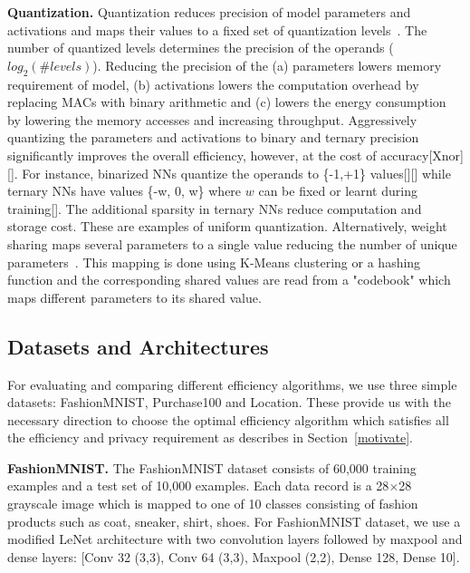 \noindent\textbf{Quantization.}
Quantization reduces precision of model parameters and activations and maps their values to a fixed set of quantization levels~\cite{Hubara:2017:QNN:3122009.3242044}.
The number of quantized levels determines the precision of the operands ($log_2(\#levels)$).
Reducing the precision of the (a) parameters lowers memory requirement of model, (b) activations lowers the computation overhead by replacing MACs with binary arithmetic and (c) lowers the energy consumption by lowering the memory accesses and increasing throughput.
Aggressively quantizing the parameters and activations to binary and ternary precision significantly improves the overall efficiency, however, at the cost of accuracy[Xnor][].
For instance, binarized NNs quantize the operands to \{-1,+1\} values[][] while ternary NNs have values \{-w, 0, w\} where $w$ can be fixed or learnt during training[].
The additional sparsity in ternary NNs reduce computation and storage cost. These are examples of uniform quantization.
Alternatively, weight sharing maps several parameters to a single value reducing the number of unique parameters~\cite{}.
This mapping is done using K-Means clustering or a hashing function and the corresponding shared values are read from a "codebook" which maps different parameters to its shared value.



\subsection{Datasets and Architectures}


For evaluating and comparing different efficiency algorithms, we use three simple datasets: FashionMNIST, Purchase100 and Location.
These provide us with the necessary direction to choose the optimal efficiency algorithm which satisfies all the efficiency and privacy requirement as describes in Section~\ref{motivate}.

\noindent\textbf{FashionMNIST.} The FashionMNIST dataset consists of 60,000 training examples and a test set of 10,000 examples.
Each data record is a 28$\times$28 grayscale image which is mapped to one of 10 classes consisting of fashion products such as coat, sneaker, shirt, shoes.
For FashionMNIST dataset, we use a modified LeNet architecture with two convolution layers followed by maxpool and dense layers: [Conv 32 (3,3), Conv 64 (3,3), Maxpool (2,2), Dense 128, Dense 10].


